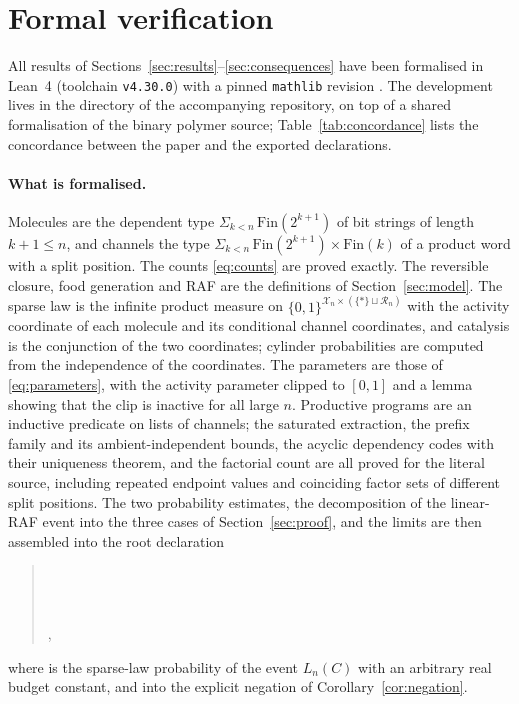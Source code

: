 \documentclass[11pt,a4paper]{article}
\theoremstyle{plain}
\theoremstyle{definition}
\theoremstyle{remark}
\newcommand{\cR}{\mathcal R}
\newcommand{\cX}{\mathcal X}
\begin{document}
\section{Formal verification}\label{sec:formal}

All results of Sections~\ref{sec:results}--\ref{sec:consequences} have been formalised in Lean~4 (toolchain \texttt{v4.30.0}) with a pinned \texttt{mathlib} revision \cite{demoura2021lean4,mathlib2020}. The development lives in the directory  of the accompanying repository, on top of a shared formalisation of the binary polymer source; Table~\ref{tab:concordance} lists the concordance between the paper and the exported declarations.

\paragraph{What is formalised.}
Molecules are the dependent type $\Sigma_{k<n}\,\mathrm{Fin}(2^{k+1})$ of bit strings of length $k+1\le n$, and channels the type $\Sigma_{k<n}\,\mathrm{Fin}(2^{k+1})\times\mathrm{Fin}(k)$ of a product word with a split position. The counts \eqref{eq:counts} are proved exactly. The reversible closure, food generation and RAF are the definitions of Section~\ref{sec:model}. The sparse law is the infinite product measure on $\{0,1\}^{\cX_n\times(\{\ast\}\sqcup\cR_n)}$ with the activity coordinate of each molecule and its conditional channel coordinates, and catalysis is the conjunction of the two coordinates; cylinder probabilities are computed from the independence of the coordinates. The parameters are those of \eqref{eq:parameters}, with the activity parameter clipped to $[0,1]$ and a lemma showing that the clip is inactive for all large $n$. Productive programs are an inductive predicate on lists of channels; the saturated extraction, the prefix family and its ambient-independent bounds, the acyclic dependency codes with their uniqueness theorem, and the factorial count are all proved for the literal source, including repeated endpoint values and coinciding factor sets of different split positions. The two probability estimates, the decomposition of the linear-RAF event into the three cases of Section~\ref{sec:proof}, and the limits are then assembled into the root declaration
\begin{quote}
\\
\\
\\
,
\end{quote}
where  is the sparse-law probability of the event $L_n(C)$ with an arbitrary real budget constant, and into the explicit negation  of Corollary~\ref{cor:negation}.
\end{document}
